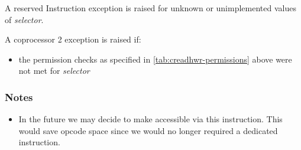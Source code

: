 A reserved Instruction exception is raised for unknown or
unimplemented values of \emph{selector}.

A coprocessor 2 exception is raised if:

\begin{itemize}
\item the permission checks as specified in \autoref{tab:creadhwr-permissions} above were not met for \emph{selector}
\end{itemize}

\subsubsection*{Notes}

\begin{itemize}
\item In the future we may decide to make \PCC{} accessible via this instruction. This would save opcode space since we would no longer required a dedicated  instruction.
\end{itemize}

